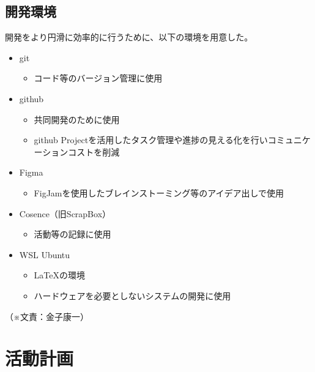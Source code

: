 \documentclass[11pt,a4paper]{report}
\newcommand{\Writer}[1]{
  \normalsize
  \begin{flushright}
    （※文責：#1）
  \end{flushright}
}
\begin{document}
\subsection{開発環境}
\noindent\space
開発をより円滑に効率的に行うために、以下の環境を用意した。
\begin{itemize}
  \item git
  \begin{itemize}
    \item コード等のバージョン管理に使用  
  \end{itemize}
  \item github
  \begin{itemize}
    \item 共同開発のために使用
    \item github Projectを活用したタスク管理や進捗の見える化を行いコミュニケーションコストを削減
  \end{itemize}
  \item Figma
  \begin{itemize}
    \item FigJamを使用したブレインストーミング等のアイデア出しで使用  
  \end{itemize}
  \item Cosence（旧ScrapBox）
  \begin{itemize}
    \item 活動等の記録に使用  
  \end{itemize}
  \item WSL Ubuntu
  \begin{itemize}
    \item LaTeXの環境
    \item ハードウェアを必要としないシステムの開発に使用  
  \end{itemize}
\end{itemize}
\Writer{金子康一}

\section{活動計画}\noindent
\end{document}
